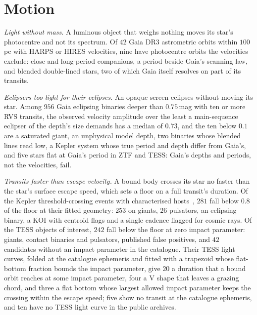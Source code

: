 \documentclass[3p,11pt]{elsarticle}
\begin{document}
\section{Motion}\label{sec:motion}

\emph{Light without mass.} A luminous object that weighs nothing moves its star's
photocentre and not its spectrum. Of $42$ Gaia DR3 astrometric orbits within $100$\,pc
with HARPS or HIRES velocities, nine have photocentre orbits the velocities exclude:
close and long-period companions, a period beside Gaia's scanning law, and blended
double-lined stars, two of which Gaia itself resolves on part of its transits.

\emph{Eclipsers too light for their eclipses.} An opaque screen eclipses without moving
its star. Among $956$ Gaia eclipsing binaries deeper than $0.75$\,mag with ten or more RVS
transits, the observed velocity amplitude over the least a main-sequence eclipser of the
depth's size demands has a median of $0.73$, and the ten below $0.1$ are a saturated
giant, an unphysical model depth, two binaries whose blended lines read low, a Kepler
system whose true period and depth differ from Gaia's, and five stars flat at Gaia's
period in ZTF and TESS: Gaia's depths and periods, not the velocities, fail.

\emph{Transits faster than escape velocity.} A bound body crosses its star no faster than
the star's surface escape speed, which sets a floor on a full transit's duration. Of the
Kepler threshold-crossing events with characterised hosts~\cite{Berger2020}, $281$ fall
below $0.8$ of the floor at their fitted geometry: $253$ on giants, $26$ pulsators, an
eclipsing binary, a KOI with centroid flags and a single cadence flagged for cosmic rays.
Of the TESS objects of interest, $242$ fall below the floor at zero impact parameter:
giants, contact binaries and pulsators, published false positives, and $42$ candidates
without an impact parameter in the catalogue. Their TESS light curves, folded at the
catalogue ephemeris and fitted with a trapezoid whose flat-bottom fraction bounds the
impact parameter, give $20$ a duration that a bound orbit reaches at some impact
parameter, four a V shape that leaves a grazing chord, and three a flat bottom whose
largest allowed impact parameter keeps the crossing within the escape speed; five show
no transit at the catalogue ephemeris, and ten have no TESS light curve in the public
archives.
\end{document}
